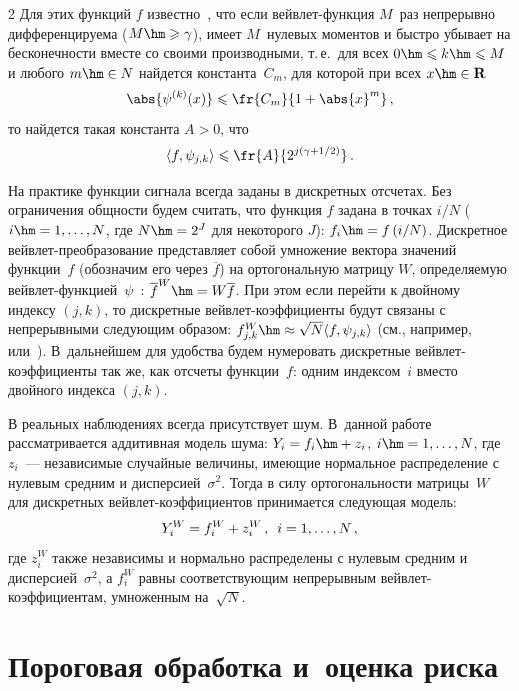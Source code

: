 \begin{multicols}{2}
Для этих функций $f$ известно~\cite{10sh}, что если вейв\-лет-функция $M$~раз 
непрерывно дифференцируема ($M\hm\geqslant\gamma$), имеет $M$~нулевых моментов 
и быст\-ро убывает на бесконечности вместе со своими производными, т.\,е.\ 
для всех $0\hm\leqslant k \hm\leqslant M$ и любого $m\hm\in N$ найдется 
константа~$C_m$, для которой при всех $x\hm\in\mathbf{R}$
$$
\abs{\psi^{(k)}(x)}\leqslant\fr{C_m}{1+\abs{x}^m}\,,
$$
то найдется такая константа $A>0$, что
\begin{equation}
\langle f,\psi_{j,k}\rangle\leqslant\fr{A}{2^{j\left(\gamma+{1}/{2}\right)}}\,.\label{e2sh}
\end{equation}

На практике функции сигнала всегда заданы в дискретных отсчетах. Без ограничения общ\-ности 
будем считать, что функция $f$ задана в точках ${i}/{N}$ ($i\hm=1,\ldots , N$, где $N\hm=2^J$ 
для некоторого $J$): $f_i\hm=f\left({i}/{N}\right)$.
Дискретное вейвлет-преобразование представляет собой умножение вектора значений функции~$f$ 
(обозначим его через $\overline{f}$) на ортогональную матрицу $W$, определяемую 
вейвлет-функцией~$\psi$~\cite{10sh}: $\overline{f}^{W}\hm=W\overline{f}$. 
При этом если перейти к двойному индексу $(j,k)$, то дискретные вейвлет-коэффициенты 
будут связаны с непрерывными следующим образом: 
$f^{W}_{j,k}\hm\approx \sqrt{N}\langle f,\psi_{j,k}\rangle$ (см., например,~\cite{1sh} 
или~\cite{11sh}). 
В~дальнейшем для удобства будем нумеровать дискретные вейв\-лет-ко\-эф\-фи\-ци\-ен\-ты 
так же, как отсчеты 
функции~$f$: одним индексом~$i$ вместо двойного индекса $(j,k)$.

В реальных наблюдениях всегда присутствует шум. В~данной работе рассматривается 
аддитивная модель шума:
$Y_i=f_i\hm+z_i$, $i\hm=1,\ldots,N$,
где $z_i$~--- независимые случайные величины, име\-ющие нормальное распределение 
с нулевым средним и дисперсией~$\sigma^2$. Тогда в силу ортогональности мат\-ри\-цы~$W$ 
для дискретных вейвлет-коэффициентов принимается следующая модель:
$$
Y^W_i=f^{W}_{i}+z^W_i\,,\enskip i=1,\ldots,N\,,
$$
где $z^W_i$ также независимы и нормально распределены с нулевым средним и дисперсией~$\sigma^2$, 
а $f^{W}_{i}$ равны соответствующим непрерывным вейв\-лет-ко\-эф\-фи\-ци\-ен\-там, умноженным на~$\sqrt{N}$.

\section{Пороговая обработка и~оценка риска}


\end{multicols}
